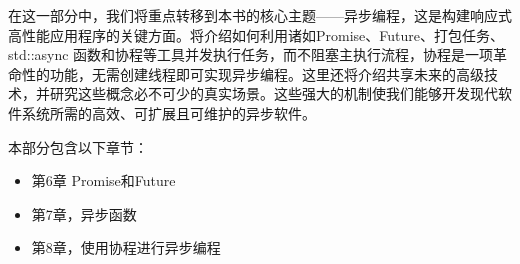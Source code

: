 在这一部分中，我们将重点转移到本书的核心主题——异步编程，这是构建响应式高性能应用程序的关键方面。将介绍如何利用诸如Promise、Future、打包任务、 std::async 函数和协程等工具并发执行任务，而不阻塞主执行流程，协程是一项革命性的功能，无需创建线程即可实现异步编程。这里还将介绍共享未来的高级技术，并研究这些概念必不可少的真实场景。这些强大的机制使我们能够开发现代软件系统所需的高效、可扩展且可维护的异步软件。

本部分包含以下章节：

\begin{itemize}
\item
第6章 Promise和Future

\item
第7章，异步函数

\item
第8章，使用协程进行异步编程
\end{itemize}